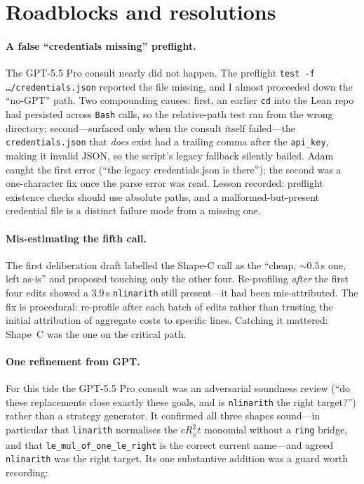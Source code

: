 \documentclass[11pt]{article}
\begin{document}
\section{Roadblocks and resolutions}

\paragraph{A false ``credentials missing'' preflight.} The GPT-5.5 Pro consult
nearly did not happen. The preflight \texttt{test -f \dots/credentials.json}
reported the file missing, and I almost proceeded down the
``no-GPT'' path. Two compounding causes: first, an earlier \texttt{cd} into the
Lean repo had persisted across \texttt{Bash} calls, so the relative-path test
ran from the wrong directory; second---surfaced only when the consult itself
failed---the \texttt{credentials.json} that \emph{does} exist had a trailing
comma after the \texttt{api\_key}, making it invalid JSON, so the script's legacy
fallback silently bailed. Adam caught the first error (``the legacy
credentials.json is there''); the second was a one-character fix once the parse
error was read. Lesson recorded: preflight existence checks should use absolute
paths, and a malformed-but-present credential file is a distinct failure mode
from a missing one.

\paragraph{Mis-estimating the fifth call.} The first deliberation draft labelled
the Shape-C call as the ``cheap, $\sim$$0.5$\,s one, left as-is'' and proposed
touching only the other four. Re-profiling \emph{after} the first four edits
showed a $3.9$\,s \texttt{nlinarith} still present---it had been mis-attributed.
The fix is procedural: re-profile after each batch of edits rather than trusting
the initial attribution of aggregate costs to specific lines. Catching it
mattered: Shape~C was the one on the critical path.

\paragraph{One refinement from GPT.} For this tide the GPT-5.5 Pro consult was
an adversarial soundness review (``do these replacements close exactly these
goals, and is \texttt{nlinarith} the right target?'') rather than a strategy
generator. It confirmed all three shapes sound---in particular that
\texttt{linarith} normalises the $c R_\varphi^2 t$ monomial without a
\texttt{ring} bridge, and that \texttt{le\_mul\_of\_one\_le\_right} is the
correct current name---and agreed \texttt{nlinarith} was the right target. Its
one substantive addition was a guard worth recording:
\end{document}
